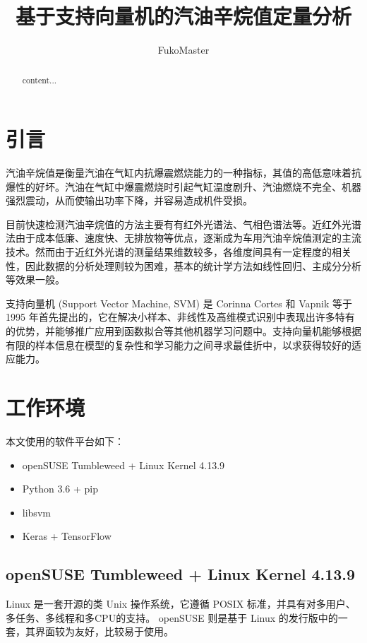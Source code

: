\documentclass[a4paper]{article}
\title{基于支持向量机的汽油辛烷值定量分析}
\author{FukoMaster}
\begin{document}
	\maketitle
	
	\begin{abstract}
		content...
	\end{abstract}
	
	\tableofcontents
	
	\section{引言}
		汽油辛烷值是衡量汽油在气缸内抗爆震燃烧能力的一种指标，其值的高低意味着抗爆性的好坏。汽油在气缸中爆震燃烧时引起气缸温度剧升、汽油燃烧不完全、机器强烈震动，从而使输出功率下降，并容易造成机件受损。
		
		目前快速检测汽油辛烷值的方法主要有有红外光谱法、气相色谱法等。近红外光谱法由于成本低廉、速度快、无排放物等优点，逐渐成为车用汽油辛烷值测定的主流技术。然而由于近红外光谱的测量结果维数较多，各维度间具有一定程度的相关性，因此数据的分析处理则较为困难，基本的统计学方法如线性回归、主成分分析等效果一般。
		
		支持向量机 (Support Vector Machine, SVM) 是 Corinna Cortes 和 Vapnik 等于 1995 年首先提出的，它在解决小样本、非线性及高维模式识别中表现出许多特有的优势，并能够推广应用到函数拟合等其他机器学习问题中。支持向量机能够根据有限的样本信息在模型的复杂性和学习能力之间寻求最佳折中，以求获得较好的适应能力。
		
	\section{工作环境}
		本文使用的软件平台如下：
		
		\begin{itemize}
			\item openSUSE Tumbleweed + Linux Kernel 4.13.9
			\item Python 3.6 + pip
			\item libsvm
			\item Keras + TensorFlow
		\end{itemize}
	
		\subsection{openSUSE Tumbleweed + Linux Kernel 4.13.9}
			Linux 是一套开源的类 Unix 操作系统，它遵循 POSIX 标准，并具有对多用户、多任务、多线程和多CPU的支持。 
			openSUSE 则是基于 Linux 的发行版中的一套，其界面较为友好，比较易于使用。
\end{document}
